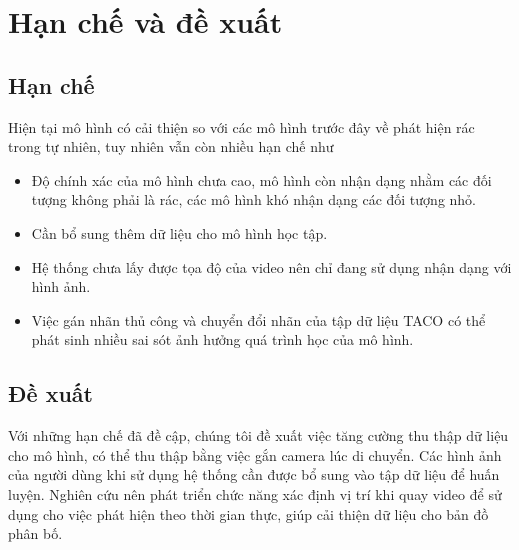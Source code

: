 \documentclass[../the.tex]{subfiles}
\begin{document}
\section{Hạn chế và đề xuất}
\subsection{Hạn chế}
{\fontsize{13}{12} \selectfont
Hiện tại mô hình có cải thiện so với các mô hình trước đây về phát hiện rác trong tự nhiên, tuy nhiên vẫn còn nhiều hạn chế như
\begin{itemize}
    \item Độ chính xác của mô hình chưa cao, mô hình còn nhận dạng nhằm các đối tượng không phải là rác, các mô hình khó nhận dạng các đối tượng nhỏ.
    \item Cần bổ sung thêm dữ liệu cho mô hình học tập.
    \item Hệ thống chưa lấy được tọa độ của video nên chỉ đang sử dụng nhận dạng với hình ảnh.
    \item Việc gán nhãn thủ công và chuyển đổi nhãn của tập dữ liệu TACO có thể phát sinh nhiều sai sót ảnh hưởng quá trình học của mô hình.	
\end{itemize}

}
\subsection{Đề xuất}
{\fontsize{13}{12} \selectfont 
Với những hạn chế đã đề cập, chúng tôi đề xuất việc tăng cường thu thập dữ liệu cho mô hình, có thể thu thập bằng việc gắn camera lúc di chuyển.
Các hình ảnh của người dùng khi sử dụng hệ thống cần được bổ sung vào tập dữ liệu để huấn luyện.
Nghiên cứu nên phát triển chức năng xác định vị trí khi quay video để sử dụng cho việc phát hiện theo thời gian thực, giúp cải thiện dữ liệu cho bản đồ phân bố.

}
\end{document}
